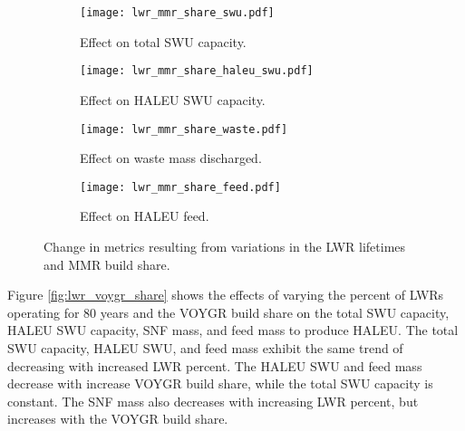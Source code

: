 \begin{figure}
    \ContinuedFloat    
    \begin{subfigure}[t]{0.48\textwidth}
        \centering
        \texttt{[image: lwr\_mmr\_share\_swu.pdf]}
        \caption{Effect on total SWU capacity.}
        \label{fig:lwr_mmr_share_swu}
    \end{subfigure}
    \hfill
    \begin{subfigure}[t]{0.48\textwidth}
        \centering
        \texttt{[image: lwr\_mmr\_share\_haleu\_swu.pdf]}
        \caption{Effect on HALEU SWU capacity.}
        \label{fig:lwr_mmr_share_haleu_swu}
    \end{subfigure}

    \begin{subfigure}[t]{0.48\textwidth}
        \centering
        \texttt{[image: lwr\_mmr\_share\_waste.pdf]}
        \caption{Effect on waste mass discharged.}
        \label{fig:lwr_mmr_share_waste}
    \end{subfigure}
    \hfill
    \begin{subfigure}[t]{0.48\textwidth}
        \centering
        \texttt{[image: lwr\_mmr\_share\_feed.pdf]}
        \caption{Effect on HALEU feed.}
        \label{fig:lwr_mmr_share_feed}
    \end{subfigure}
    \caption{Change in metrics resulting from variations in the 
    LWR lifetimes and MMR build share.}
    \label{fig:lwr_mmr_share}
\end{figure}

Figure \ref{fig:lwr_voygr_share} shows the effects of varying the 
percent of \glspl{LWR} operating for 80 years and the VOYGR build share
on the total \gls{SWU} capacity, \gls{HALEU} \gls{SWU} capacity, 
\gls{SNF} mass, and feed mass to produce \gls{HALEU}. The total 
\gls{SWU} capacity, \gls{HALEU} \gls{SWU}, and feed mass exhibit the same 
trend of decreasing with increased \gls{LWR} percent. The \gls{HALEU} 
\gls{SWU} and feed mass decrease with increase VOYGR build share, 
while the total \gls{SWU} capacity is constant. The \gls{SNF} mass 
also decreases with increasing \gls{LWR} percent, but increases with 
the VOYGR build share. 

